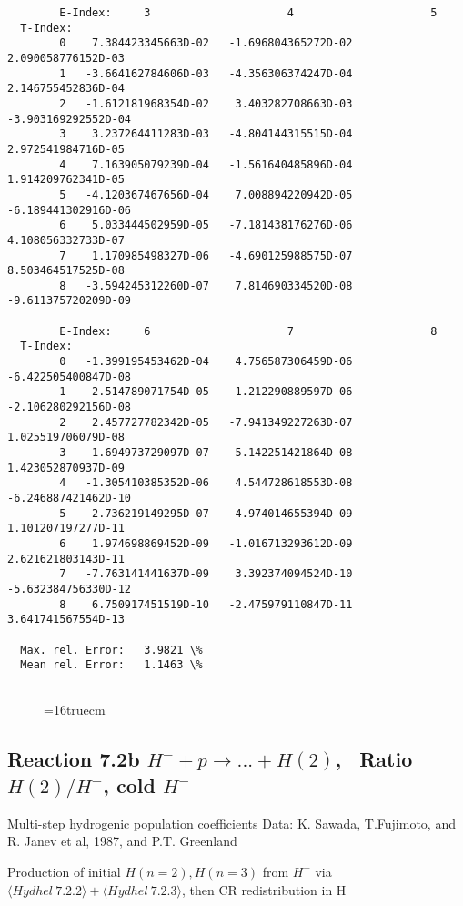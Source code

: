 \documentclass[12pt,dvipdfmx]{article}
\begin{document}
{\begin{small}
\begin{verbatim}
        E-Index:     3                     4                     5
  T-Index:
        0    7.384423345663D-02   -1.696804365272D-02    2.090058776152D-03
        1   -3.664162784606D-03   -4.356306374247D-04    2.146755452836D-04
        2   -1.612181968354D-02    3.403282708663D-03   -3.903169292552D-04
        3    3.237264411283D-03   -4.804144315515D-04    2.972541984716D-05
        4    7.163905079239D-04   -1.561640485896D-04    1.914209762341D-05
        5   -4.120367467656D-04    7.008894220942D-05   -6.189441302916D-06
        6    5.033444502959D-05   -7.181438176276D-06    4.108056332733D-07
        7    1.170985498327D-06   -4.690125988575D-07    8.503464517525D-08
        8   -3.594245312260D-07    7.814690334520D-08   -9.611375720209D-09

        E-Index:     6                     7                     8
  T-Index:
        0   -1.399195453462D-04    4.756587306459D-06   -6.422505400847D-08
        1   -2.514789071754D-05    1.212290889597D-06   -2.106280292156D-08
        2    2.457727782342D-05   -7.941349227263D-07    1.025519706079D-08
        3   -1.694973729097D-07   -5.142251421864D-08    1.423052870937D-09
        4   -1.305410385352D-06    4.544728618553D-08   -6.246887421462D-10
        5    2.736219149295D-07   -4.974014655394D-09    1.101207197277D-11
        6    1.974698869452D-09   -1.016713293612D-09    2.621621803143D-11
        7   -7.763141441637D-09    3.392374094524D-10   -5.632384756330D-12
        8    6.750917451519D-10   -2.475979110847D-11    3.641741567554D-13

  Max. rel. Error:   3.9821 \%
  Mean rel. Error:   1.1463 \%


\end{verbatim}\end{small}
\begin{figure} \label{7.2a}
\epsfxsize=16truecm
\end{figure}
\newpage


\subsection{
Reaction 7.2b $ H^- + p \rightarrow ...+ H(2) $, \   Ratio $H(2)/H^- $, cold $H^-$
}
 Multi-step hydrogenic population coefficients
 Data: K. Sawada, T.Fujimoto, \cite{kn:Sawada} and R. Janev et al, 1987, and P.T. Greenland

Production of initial $H(n=2), H(n=3)$ from $H^-$ via $ \langle Hydhel~ 7.2.2\rangle + \langle Hydhel~ 7.2.3\rangle$,
 then CR redistribution in H

}
\end{document}
